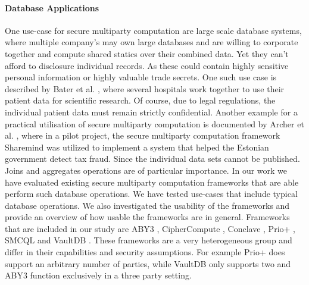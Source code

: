 \paragraph{Database Applications}
One use-case for secure multiparty computation are large scale database systems, where multiple company's may own large databases and are willing to corporate together and compute shared statics over their combined data. Yet they can't afford to disclosure individual records. As these could contain highly sensitive personal information or highly valuable trade secrets. One such use case is described by Bater et al. \cite{bater}, where several hospitals work together to use their patient data for scientific research. Of course, due to legal regulations, the individual patient data must remain strictly confidential. Another example for a practical utilisation of secure multiparty computation is documented by Archer et al. \cite{Archer2018FromKT}, where in a pilot project, the secure multiparty computation framework Sharemind \cite{bogdanov2015estonian} was utilized to implement a system that helped the Estonian government detect tax fraud. Since the individual data sets cannot be published. Joins and aggregates operations are of particular importance. In our work we have evaluated existing secure multiparty computation frameworks that are able perform such database operations. We have tested use-cases that include typical database operations. We also investigated the usability of the frameworks and provide an overview of how usable the frameworks are in general. Frameworks that are included in our study are ABY3 \cite{aby3}, CipherCompute \cite{Cosmian}, Conclave \cite{10.1145/3302424.3303982}, Prio+ \cite{cryptoeprint:2021:576} , SMCQL \cite{bater} and VaultDB \cite{rogers2022vaultdb}. These frameworks are a very heterogeneous group and differ in their capabilities and security assumptions. For example Prio+ does support an arbitrary number of parties, while VaultDB only supports two and ABY3 function exclusively in a three party setting.












